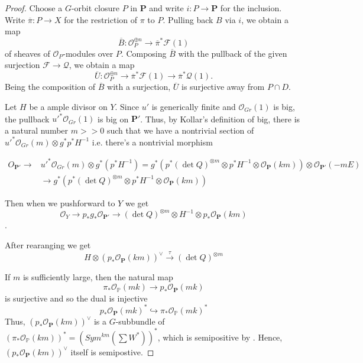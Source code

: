 \begin{proof}
Choose a $G$-orbit closure $P$ in $\mathbf{P}$ and write $i : P \to \mathbf{P}$
for the inclusion.
Write $\overline{\pi} : P \to X$ for the restriction of $\pi$ to $P$.
Pulling back $B$ via $i$, we obtain a map
$$
  \overline{B} : \mathcal{O}_P^{\oplus n} \to \overline{\pi}^* \mathcal{F}(1)
$$
of sheaves of $\mathcal{O}_P$-modules over $P$.
Composing $\overline{B}$ with the pullback of the given surjection
$\mathcal{F} \to \mathcal{Q}$, we obtain a map
$$
  \overline{U} : \mathcal{O}_P^{\oplus n} \to
                  \overline{\pi}^*\mathcal{F}(1) \to
                  \overline{\pi}^*\mathcal{Q}(1).
$$
Being the composition of $\overline{B}$ with a surjection, $\overline{U}$ is
surjective away from $P \cap D$.

Let $H$ be a ample divisor on $Y$. Since $u'$ is generically finite and $\mathcal{O}_{Gr}(1)$ is big, the pullback $u'^*  \mathcal{O}_{Gr}(1)$ is big on $\mathbf{P}'$.  Thus, by Kollar's definition of big, there is a natural number $m>>0$ such that we have a nontrivial section of $u'^*\mathcal{O}_{Gr}(m)\otimes g^*p^*H^{-1}$ i.e. there's a nontrivial morphism 

\begin{align*}
{O}_{\mathbf{P}'}\to & u'^*\mathcal{O}_{Gr}(m)\otimes g^*(p^*H^{-1})=g^*(p^*(\det Q)^{\otimes m}\otimes p^*H^{-1}\otimes \mathcal{O}_{\mathbf{P}}(km))\otimes \mathcal{O}_{\mathbf{P}'}(-mE)\\&\to g^*(p^*(\det Q)^{\otimes m}\otimes p^*H^{-1}\otimes \mathcal{O}_{\mathbf{P}}(km))
\end{align*} 

Then when we pushforward to $Y$ we get $$\mathcal{O}_Y\to p_*g_*\mathcal{O}_{\mathbf{P}'}\to (\det Q)^{\otimes m}\otimes H^{-1}\otimes p_*\mathcal{O}_{\mathbf{P}}(km)$$ .

After rearanging we get $$H\otimes (p_*\mathcal{O}_{\mathbf{P}}(km))^{\vee}\stackrel{\tau}\to (\det Q)^{\otimes m}$$ 

If $m$ is sufficiently large, then the natural map $$\pi_*\mathcal{O}_{\mathbb{P}}(mk)\to p_*\mathcal{O}_{\mathbf{P}}(mk)$$ is surjective and so the dual is injective $$p_*\mathcal{O}_{\mathbf{P}}(mk)^*\hookrightarrow \pi_*\mathcal{O}_{\mathbb{P}}(mk)^*$$ Thus, $(p_*\mathcal{O}_{\mathbf{P}}(km))^{\vee}$ is a $G$-subbundle  of $(\pi_*\mathcal{O}_{\mathbb{P}}(km))^*=(Sym^{km}(\sum W^*))^*$, which is semipositive by . Hence, $(p_*\mathcal{O}_{\mathbf{P}}(km))^{\vee}$  itself is semipostive. 


\end{proof}
